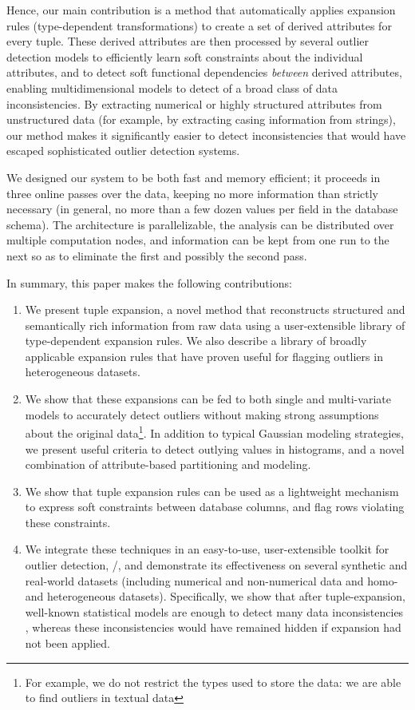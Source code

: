 Hence, our main contribution is a method that automatically applies expansion rules (type-dependent transformations) to create a set of derived attributes for every tuple. These derived attributes are then processed by several outlier detection models to efficiently learn soft constraints about the individual attributes, and to detect soft functional dependencies \textit{between} derived attributes, enabling multidimensional models to detect of a broad class of data inconsistencies. By extracting numerical or highly structured attributes from unstructured data (for example, by extracting casing information from strings), our method makes it significantly easier to detect inconsistencies that would have escaped sophisticated outlier detection systems.

We designed our system to be both fast and memory efficient; it proceeds in three online passes over the data, keeping no more information than strictly necessary (in general, no more than a few dozen values per field in the database schema). The architecture is parallelizable, the analysis can be distributed over multiple computation nodes, and information can be kept from one run to the next so as to eliminate the first and possibly the second pass.

In summary, this paper makes the following contributions:
\begin{enumerate}

\item We present tuple expansion, a novel method that reconstructs structured and semantically rich information from raw data using a user-extensible library of type-dependent expansion rules.
We also describe a library of broadly applicable expansion rules that have proven useful for flagging outliers in heterogeneous datasets.
\item We show that these expansions can be fed to both single and multi-variate models to accurately detect outliers without making strong assumptions about the original data\footnote{For example, we do not restrict the types used to store the data: we are able to find outliers in textual data}. In addition to typical Gaussian modeling strategies, we present useful criteria to detect outlying values in histograms, and a novel combination of attribute-based partitioning and modeling.
\item We show that tuple expansion rules can be used as a lightweight mechanism to express soft constraints between database columns, and flag rows violating these constraints.
\item We integrate these techniques in an easy-to-use, user-extensible toolkit for outlier detection, \dBoost/, and demonstrate its effectiveness on several synthetic and real-world datasets (including numerical and non-numerical data and homo- and heterogeneous datasets).
Specifically, we show that after tuple-expansion, well-known statistical models are enough to detect many data inconsistencies , whereas these inconsistencies would have remained hidden if expansion had not been applied.
\end{enumerate}

